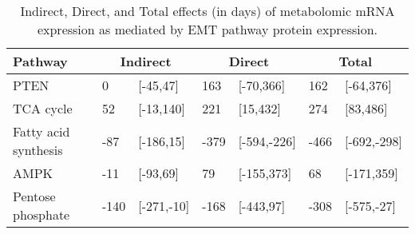\begin{table}[ht]
\centering
\begin{tabular}{lllllll}
  \hline
  Pathway & \multicolumn{2}{c}{Indirect} & \multicolumn{2}{c}{Direct}  & \multicolumn{2}{c}{Total} \\
 \hline
PTEN & 0 & [-45,47] & 163 & [-70,366] & 162 & [-64,376] \\ 
  TCA cycle & 52 & [-13,140] & 221 & [15,432] & 274 & [83,486] \\ 
  Fatty acid synthesis & -87 & [-186,15] & -379 & [-594,-226] & -466 & [-692,-298] \\ 
  AMPK & -11 & [-93,69] & 79 & [-155,373] & 68 & [-171,359] \\ 
  Pentose phosphate & -140 & [-271,-10] & -168 & [-443,97] & -308 & [-575,-27] \\ 
   \hline
\end{tabular}
\caption{Indirect, Direct, and Total effects (in days) of metabolomic mRNA expression as mediated by EMT pathway protein expression.} 
\end{table}

